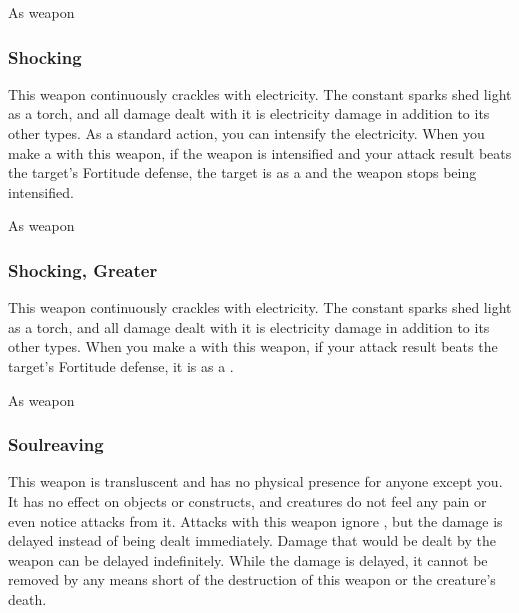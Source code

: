  As weapon


\lowercase{\hypertarget{item:Shocking}{}}\label{item:Shocking}
\hypertarget{item:Shocking}{\subsubsection{Shocking\hfill{}}}

This weapon continuously crackles with electricity.
The constant sparks shed light as a torch, and all damage dealt with it is electricity damage in addition to its other types.
As a standard action, you can intensify the electricity.
When you make a  with this weapon, if the weapon is intensified and your attack result beats the target's Fortitude defense,
the target is \dazed as a  and the weapon stops being intensified.



 


 As weapon


\lowercase{\hypertarget{item:Shocking, Greater}{}}\label{item:Shocking, Greater}
\hypertarget{item:Shocking, Greater}{\subsubsection{Shocking, Greater\hfill{}}}

This weapon continuously crackles with electricity.
The constant sparks shed light as a torch, and all damage dealt with it is electricity damage in addition to its other types.
When you make a  with this weapon, if your attack result beats the target's Fortitude defense, it is \dazed as a .



 


 As weapon


\lowercase{\hypertarget{item:Soulreaving}{}}\label{item:Soulreaving}
\hypertarget{item:Soulreaving}{\subsubsection{Soulreaving\hfill{}}}

This weapon is transluscent and has no physical presence for anyone except you.
It has no effect on objects or constructs, and creatures do not feel any pain or even notice attacks from it.
Attacks with this weapon ignore , but the damage is delayed instead of being dealt immediately.
Damage that would be dealt by the weapon can be delayed indefinitely.
While the damage is delayed, it cannot be removed by any means short of the destruction of this weapon or the creature's death.

